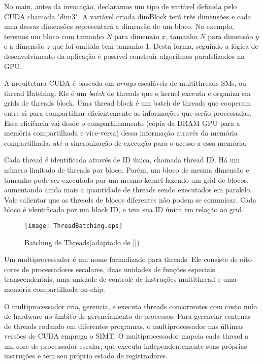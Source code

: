 No main, antes da invocação, declaramos um tipo de variável definida pelo CUDA chamada "dim3". A variável criada dimBlock terá três dimensões e cada uma dessas dimensões representará a dimensão de um bloco. No exemplo, teremos um bloco com tamanho $N$ para dimensão $x$, tamanho $N$ para dimensão $y$ e a dimensão $z$ que foi omitida tem tamanho 1. Desta forma, seguindo a lógica de desenvolvimento da aplicação é possível construir algoritmos paralelizados na GPU.


A arquitetura CUDA é baseada em \textit{arrays} escaláveis de multithreads SMs, ou thread Batching. Ele é um \textit{batch} de threads que o kernel executa e organiza em grids de threads block. Uma thread block é um batch de threads que cooperam entre si para compartilhar eficientemente as informações que serão processadas. Essa eficiência vai desde o compartilhamento (cópia da DRAM GPU para a memória compartilhada e vice-versa) dessa informação através da memória compartilhada, até a sincronização de execução para o acesso a essa memória.

Cada thread é identificada através de ID única, chamada thread ID. Há um número limitado de threads por bloco. Porém, um bloco de mesma dimensão e tamanho pode ser executado por um mesmo kernel fazendo um grid de blocos, aumentando ainda mais a quantidade de threads sendo executados em paralelo. Vale salientar que as threads de blocos diferentes não podem se comunicar.
Cada bloco é identificado por um block ID, e tem sua ID única em relação ao grid.

\begin{figure}[!htb]
	\begin{center}
	\centering
			\texttt{[image: ThreadBatching.eps]}
	\caption{Batching de Threads(adaptado de [\cite{cuda}])}
	\label{fig:ThreadBatching}
	\end{center}
\end{figure}

Um multiprocessador é um nome formalizado para threads. Ele consiste de oito cores de processadores escalares, duas unidades de funções especiais transcendentais, uma unidade de controle de instruções multithread e uma memória compartilhada on-chip.

O multiprocessador cria, gerencia, e executa threads concorrentes com custo nulo de hardware no âmbito de gerenciamento de processos. Para gerenciar centenas de threads rodando em diferentes programas, o multiprocessador nas últimas versões de CUDA emprega o SIMT. O multiprocessador mapeia cada thread a um core de processador escalar, que executa independentemente suas próprias instruções e tem seu próprio estado de registradores.

